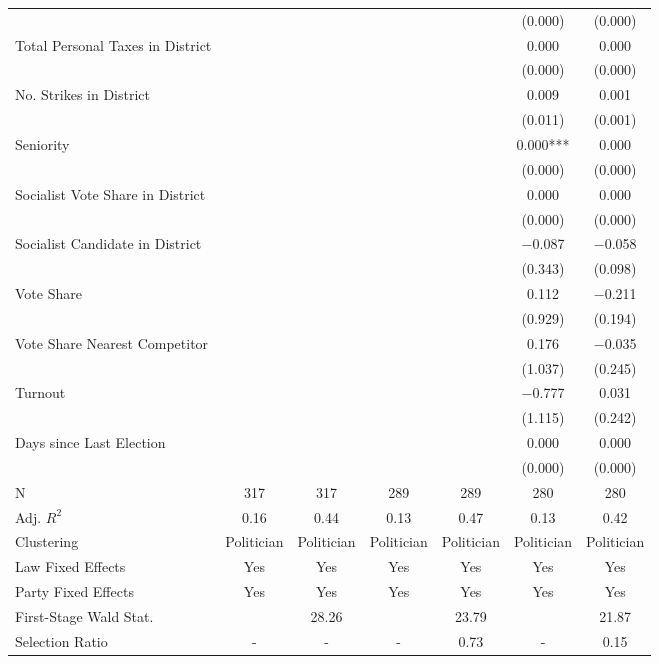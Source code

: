 \begin{table}[!h]
{\begin{threeparttable}
\begin{tabular}[t]{lcccccc}
 &  &  &  &  & (\num{0.000}) & \vphantom{4} (\num{0.000})\\
Total Personal Taxes in District &  &  &  &  & \num{0.000} & \num{0.000}\\
 &  &  &  &  & (\num{0.000}) & \vphantom{3} (\num{0.000})\\
No. Strikes in District &  &  &  &  & \num{0.009} & \num{0.001}\\
 &  &  &  &  & (\num{0.011}) & (\num{0.001})\\
Seniority &  &  &  &  & \num{0.000}*** & \num{0.000}\\
 &  &  &  &  & (\num{0.000}) & \vphantom{2} (\num{0.000})\\
Socialist Vote Share in District &  &  &  &  & \num{0.000} & \num{0.000}\\
 &  &  &  &  & (\num{0.000}) & \vphantom{1} (\num{0.000})\\
Socialist Candidate in District &  &  &  &  & \num{-0.087} & \num{-0.058}\\
 &  &  &  &  & (\num{0.343}) & (\num{0.098})\\
Vote Share &  &  &  &  & \num{0.112} & \num{-0.211}\\
 &  &  &  &  & (\num{0.929}) & (\num{0.194})\\
Vote Share Nearest Competitor &  &  &  &  & \num{0.176} & \num{-0.035}\\
 &  &  &  &  & (\num{1.037}) & (\num{0.245})\\
Turnout &  &  &  &  & \num{-0.777} & \num{0.031}\\
 &  &  &  &  & (\num{1.115}) & (\num{0.242})\\
Days since Last Election &  &  &  &  & \num{0.000} & \num{0.000}\\
 &  &  &  &  & (\num{0.000}) & (\num{0.000})\\
\midrule
N & \num{317} & \num{317} & \num{289} & \num{289} & \num{280} & \num{280}\\
Adj. $R^2$ & \num{0.16} & \num{0.44} & \num{0.13} & \num{0.47} & \num{0.13} & \num{0.42}\\
Clustering & Politician & Politician & Politician & Politician & Politician & Politician\\
Law Fixed Effects & Yes & Yes & Yes & Yes & Yes & Yes\\
Party Fixed Effects & Yes & Yes & Yes & Yes & Yes & Yes\\
First-Stage Wald Stat. &  & 28.26 &  & 23.79 &  & 21.87\\
Selection Ratio & - & - & - & 0.73 & - & 0.15\\

\end{tabular}
\end{threeparttable}}
\end{table}

